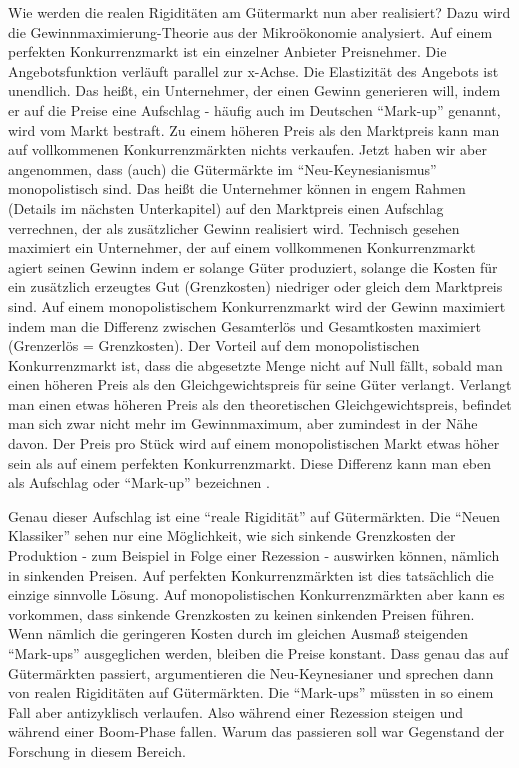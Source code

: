 Wie werden die realen Rigiditäten am Gütermarkt nun aber realisiert? Dazu wird die Gewinnmaximierung-Theorie aus der Mikroökonomie analysiert. Auf einem perfekten Konkurrenzmarkt ist ein einzelner Anbieter Preisnehmer. Die Angebotsfunktion verläuft parallel zur x-Achse. Die Elastizität des Angebots ist unendlich. Das heißt, ein Unternehmer, der einen Gewinn generieren will, indem er auf die Preise eine Aufschlag - häufig auch im Deutschen "`Mark-up"' genannt, wird vom Markt bestraft. Zu einem höheren Preis als den Marktpreis kann man auf vollkommenen Konkurrenzmärkten nichts verkaufen. Jetzt haben wir aber angenommen, dass (auch) die Gütermärkte im "`Neu-Keynesianismus"' monopolistisch sind. Das heißt die Unternehmer können in engem Rahmen (Details im nächsten Unterkapitel) auf den Marktpreis einen Aufschlag verrechnen, der als zusätzlicher Gewinn realisiert wird. Technisch gesehen maximiert ein Unternehmer, der auf einem vollkommenen Konkurrenzmarkt agiert seinen Gewinn indem er solange Güter produziert, solange die Kosten für ein zusätzlich erzeugtes Gut (Grenzkosten) niedriger oder gleich dem Marktpreis sind. Auf einem monopolistischem Konkurrenzmarkt wird der Gewinn maximiert indem man die Differenz zwischen Gesamterlös und Gesamtkosten maximiert (Grenzerlös = Grenzkosten).  Der Vorteil auf dem monopolistischen Konkurrenzmarkt ist, dass die abgesetzte Menge nicht auf Null fällt, sobald man einen höheren Preis als den Gleichgewichtspreis für seine Güter verlangt. Verlangt man einen etwas höheren Preis als den theoretischen Gleichgewichtspreis, befindet man sich zwar nicht mehr im Gewinnmaximum, aber zumindest in der Nähe davon. Der Preis pro Stück wird auf einem monopolistischen Markt etwas höher sein als auf einem perfekten Konkurrenzmarkt. Diese Differenz kann man eben als Aufschlag oder "`Mark-up"' bezeichnen \parencite[S. 379f]{Snowdon2005} \parencite[S. 14]{Mankiw1991}. 

Genau dieser Aufschlag ist eine "`reale Rigidität"' auf Gütermärkten. Die "`Neuen Klassiker"' sehen nur eine Möglichkeit, wie sich sinkende Grenzkosten der Produktion - zum Beispiel in Folge einer Rezession - auswirken können, nämlich in sinkenden Preisen. Auf perfekten Konkurrenzmärkten ist dies tatsächlich die einzige sinnvolle Lösung. Auf monopolistischen Konkurrenzmärkten aber kann es vorkommen, dass sinkende Grenzkosten zu keinen sinkenden Preisen führen. Wenn nämlich die geringeren Kosten durch im gleichen Ausmaß steigenden "`Mark-ups"' ausgeglichen werden, bleiben die Preise konstant. Dass genau das auf Gütermärkten passiert, argumentieren die Neu-Keynesianer und sprechen dann von realen Rigiditäten auf Gütermärkten. Die "`Mark-ups"' müssten in so einem Fall aber antizyklisch verlaufen. Also während einer Rezession steigen und während einer Boom-Phase fallen. Warum das passieren soll war Gegenstand der Forschung in diesem Bereich.

